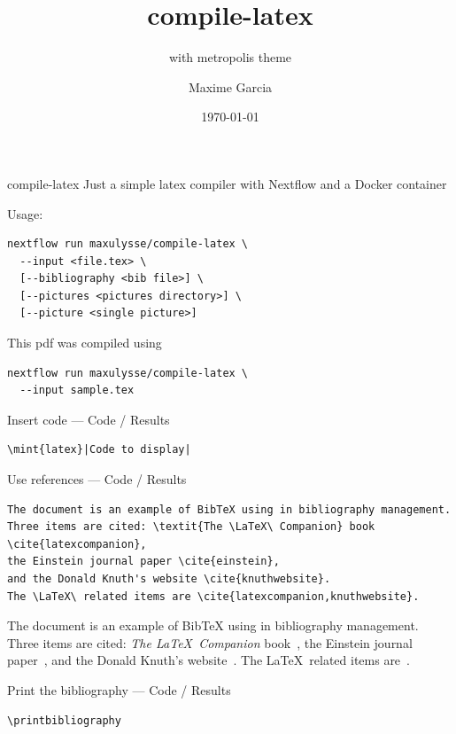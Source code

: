\documentclass{beamer}
\author{Maxime Garcia}
\date{\today}
\institute{maxulysse}
\subtitle{with metropolis theme}
\title{compile-latex}
\begin{document}
\maketitle

\begin{frame}[fragile]{compile-latex}
  Just a simple latex compiler with Nextflow and a Docker container

  Usage:
  \begin{verbatim}
nextflow run maxulysse/compile-latex \
  --input <file.tex> \
  [--bibliography <bib file>] \
  [--pictures <pictures directory>] \
  [--picture <single picture>]
  \end{verbatim}
  This pdf was compiled using
  \begin{verbatim}
nextflow run maxulysse/compile-latex \
  --input sample.tex
  \end{verbatim}
\end{frame}

\begin{frame}[fragile]{Insert code --- Code / Results}
\begin{verbatim}
\mint{latex}|Code to display|
\end{verbatim}
\end{frame}

\begin{frame}[fragile]{Use references --- Code / Results}
\begin{verbatim}
The document is an example of BibTeX using in bibliography management.
Three items are cited: \textit{The \LaTeX\ Companion} book \cite{latexcompanion},
the Einstein journal paper \cite{einstein},
and the Donald Knuth's website \cite{knuthwebsite}.
The \LaTeX\ related items are \cite{latexcompanion,knuthwebsite}.
\end{verbatim}
The document is an example of BibTeX using in bibliography management.
Three items are cited: \textit{The \LaTeX\ Companion} book~\cite{latexcompanion},
the Einstein journal paper~\cite{einstein},
and the Donald Knuth's website~\cite{knuthwebsite}.
The \LaTeX\ related items are~\cite{latexcompanion,knuthwebsite}.
\end{frame}

\begin{frame}[fragile]{Print the bibliography --- Code / Results}
\begin{verbatim}
\printbibliography
\end{verbatim}
\printbibliography{}
\end{frame}
\end{document}
